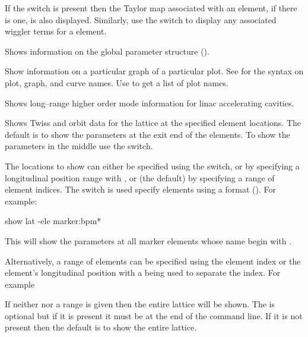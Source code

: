 {\begin{description}
If the  switch is present then the Taylor map associated
with an element, if there is one, is also displayed.  Similarly, use
the  switch to display any associated wiggler terms for
a   element.

  \item[show global]
Shows information on the global parameter structure ().

  \item[show graph]
Show information on a particular graph of a particular plot. See
 for the syntax on plot, graph, and curve names.
Use  to get a list of plot names.

  \item[show hom]
Shows long--range higher order mode information for linac accelerating
cavities.

  \item[show lattice]
Shows Twiss and orbit data for the  lattice at the specified
element locations. The default is to show the parameters at the exit
end of the elements. To show the parameters in the middle use the
 switch.

The locations to show can either be specified using the 
switch, or by specifying a longitudinal position range with ,
or (the default) by specifying a range of element indices.  The
 switch is used specify elements using a 
format (). For example:
\begin{example}
  show lat -ele marker:bpm*
\end{example}
This will show the parameters at all marker elements whose name begin
with . 

Alternatively, a range of elements can be specified using the element
index or the element's longitudinal position with a  being
used to separate the index. For example
If neither  nor a range is given then the entire lattice
will be shown. The  is optional but if it is present
it must be at the end of the command line.  If it is not present then
the default is to show the entire lattice.


\end{description}}

